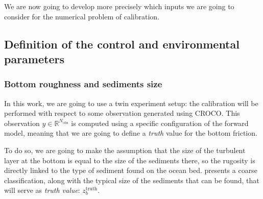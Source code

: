 \documentclass[../../Main_ManuscritThese.tex]{subfiles}
\newcommand{\zob}{z_b}
\begin{document}
We are now going to develop more precisely which inputs we are going
to consider for the numerical problem of calibration.


\subsection{Definition of the control and environmental parameters}
\subsubsection{Bottom roughness and sediments size}
In this work, we are going to use a twin experiment setup: the
calibration will be performed with respect to some observation
generated using CROCO.  This observation
$y\in\mathbb{R}^{N_{\mathrm{obs}}}$ is computed using a specific
configuration of the forward model, meaning that we are going to
define a \emph{truth} value for the bottom friction.


To do so, we are going to make the assumption that the size of the
turbulent layer at the bottom is equal to the size of the sediments
there, so the rugosity is directly linked to the type of sediment
found on the ocean bed.  presents a coarse
classification, along with the typical size of the sediments that can
be found, that will serve as \emph{truth value}:
$\zob^{\mathrm{truth}}$.  %
\end{document}

